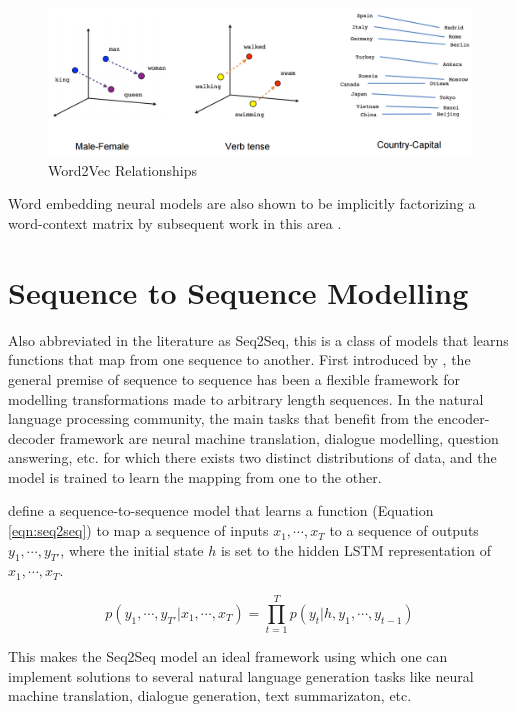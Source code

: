 \begin{figure}[ht]
	\centering
	\includegraphics[width=\textwidth]{images/word2vec-linear-relationships}
	\caption{\label{fig:word2vec-linear-relationships} Word2Vec Relationships}
\end{figure}

Word embedding neural models are also shown to be implicitly factorizing a word-context matrix by subsequent work in this area \citep{levy2014neural}.


\section{Sequence to Sequence Modelling}

Also abbreviated in the literature as Seq2Seq, this is a class of models that learns functions that map from one sequence to another. First introduced by \cite{sutskever2014sequence}, the general premise of sequence to sequence has been a flexible framework for modelling transformations made to arbitrary length sequences. In the natural language processing community, the main tasks that benefit from the encoder-decoder framework are neural machine translation, dialogue modelling, question answering, etc. for which there exists two distinct distributions of data, and the model is trained to learn the mapping from one to the other.

\cite{sutskever2014sequence} define a sequence-to-sequence model that learns a function (Equation \ref{eqn:seq2seq}) to map a sequence of inputs $x_1, \cdots , x_T$ to a sequence of outputs $y_1, \cdots , y_{T'}$, where the initial state $h$ is set to the hidden LSTM representation of $x_1, \cdots , x_T$.

\begin{equation} \label{eqn:seq2seq}
	p(y_1, \cdots , y_{T'} | x_1, \cdots , x_T) =	\prod_{t=1}^T p(y_t | h, y_1, \cdots , y_{t-1})
\end{equation}

This makes the Seq2Seq model an ideal framework using which one can implement solutions to several natural language generation tasks like neural machine translation, dialogue generation, text summarizaton, etc.

